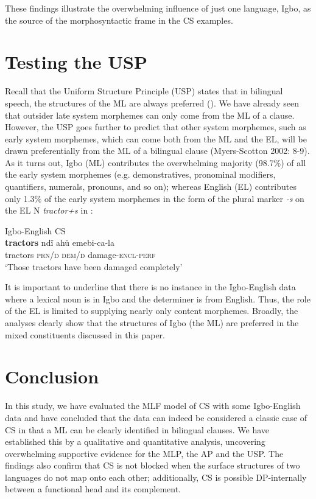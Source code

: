 \documentclass[output=paper]{langsci/langscibook}
\begin{document}
 

These findings illustrate the overwhelming influence of just one language, Igbo, as the source of the morphosyntactic frame in the CS examples. 

\section{Testing the USP}

Recall that the Uniform Structure Principle (USP) states that in bilingual speech, the structures of the ML are always preferred (). We have already seen that outsider late system morphemes can only come from the ML of a clause. However, the USP goes further to predict that other system morphemes, such as early system morphemes, which can come both from the ML and the EL, will be drawn preferentially from the ML of a bilingual clause (Myers-Scotton 2002: 8-9). As it turns out, Igbo (ML) contributes the overwhelming majority (98.7\%) of all the early system morphemes (e.g. demonstratives, pronominal modifiers, quantifiers, numerals, pronouns, and so on); whereas English (EL) contributes only 1.3\% of the early system morphemes in the form of the plural marker \textit{{}-s} on the EL N \textit{tractor+s }in : 

\ea
{Igbo-English CS}\\
\gll \textbf{tractors  }ndï    ahü  emebi-ca-la\\
     tractors  \textsc{prn/d}\textsubscript{    }\textsc{dem/d}  damage-\textsc{encl-perf}\textsubscript{ }\\
\glt ‘Those tractors have been damaged completely’
\z

It is important to underline that there is no instance in the Igbo-English data where a lexical noun is in Igbo and the determiner is from English. Thus, the role of the EL is limited to supplying nearly only content morphemes. Broadly, the analyses clearly show that the structures of Igbo (the ML) are preferred in the mixed constituents discussed in this paper.

\section{Conclusion}

In this study, we have evaluated the MLF model of CS with some Igbo-English data and have concluded that the data can indeed be considered a classic case of CS in that a ML can be clearly identified in bilingual clauses. We have established this by a qualitative and quantitative analysis, uncovering overwhelming supportive evidence for the MLP, the AP and the USP. The findings also confirm that CS is not blocked when the surface structures of two languages do not map onto each other; additionally, CS is possible DP-internally between a functional head and its complement. 
\end{document}
